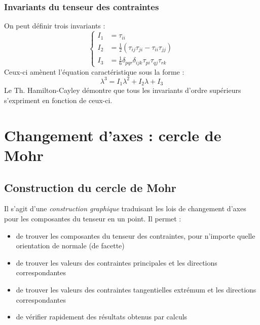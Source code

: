        \subsubsection{Invariants du tenseur des contraintes}
        On peut définir trois invariants :
        \begin{equation}
        \left\{\begin{array}{ll}
        I_1 &= \tau_{ii} \\
        I_2 &= \frac{1}{2} (\tau_{ij}\tau_{ji} - \tau_{ii}\tau_{jj})\\
        I_3 &= \frac{1}{6}\delta_{pqr}\delta_{ijk}\tau_{pi}\tau_{qj}\tau_{rk}
        \end{array}\right.
        \end{equation}
        Ceux-ci amènent l'équation caractéristique sous la forme :
        \begin{equation}
        \lambda^3 = I_1 \lambda^2 + I_2 \lambda + I_3
        \end{equation}
        Le Th. Hamilton-Cayley démontre que tous les invariants d'ordre supérieurs s'expriment en fonction
        de ceux-ci.
    

\section{Changement d'axes : cercle de Mohr}
    \subsection{Construction du cercle de Mohr}
    Il s'agit d'une \textit{construction graphique} traduisant les lois de changement d'axes pour les 
    composantes du tenseur en un point. Il permet :
    \begin{itemize}
    \item de trouver les composantes du tenseur des contraintes, pour n'importe quelle orientation de
    normale (de facette)
    \item de trouver les valeurs des contraintes principales et les  directions correspondantes
    \item de trouver les valeurs des contraintes tangentielles extrémum et les directions 
    correspondantes
    \item de vérifier rapidement des résultats obtenus par calculs
    \end{itemize}
    
